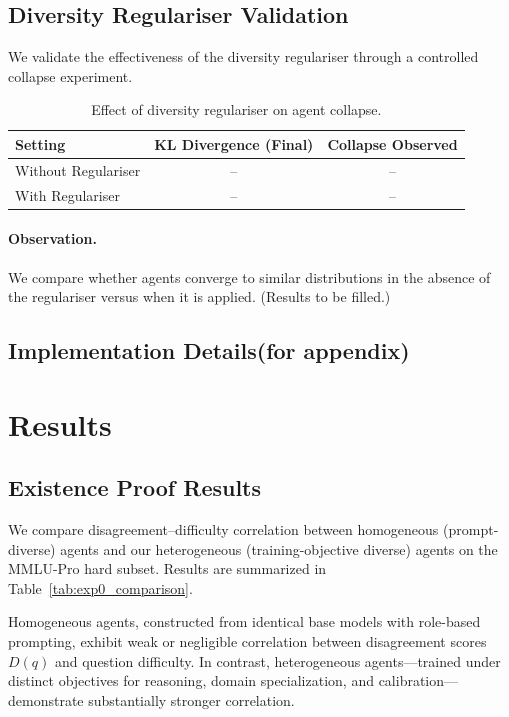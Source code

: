 \documentclass{article}
\begin{document}
\subsection{Diversity Regulariser Validation}

We validate the effectiveness of the diversity regulariser through a controlled collapse experiment.

\begin{table}[h]
\centering
\caption{Effect of diversity regulariser on agent collapse.}
\label{tab:regulariser}
\begin{tabular}{lcc}
\toprule
\textbf{Setting} & \textbf{KL Divergence (Final)} & \textbf{Collapse Observed} \\
\midrule
Without Regulariser & -- & -- \\
With Regulariser & -- & -- \\
\bottomrule
\end{tabular}
\end{table}

\paragraph{Observation.}
We compare whether agents converge to similar distributions in the absence of the regulariser versus when it is applied. (Results to be filled.)

\subsection{Implementation Details(for appendix)}
\section{Results}

\subsection{Existence Proof Results}

We compare disagreement–difficulty correlation between homogeneous (prompt-diverse) agents and our heterogeneous (training-objective diverse) agents on the MMLU-Pro hard subset. Results are summarized in Table~\ref{tab:exp0_comparison}.

Homogeneous agents, constructed from identical base models with role-based prompting, exhibit weak or negligible correlation between disagreement scores $D(q)$ and question difficulty. In contrast, heterogeneous agents—trained under distinct objectives for reasoning, domain specialization, and calibration—demonstrate substantially stronger correlation.
\end{document}
